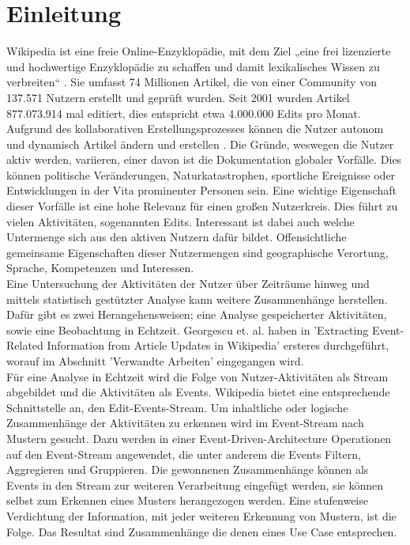 \section{Einleitung}\label{sec:Einleitung}
Wikipedia ist eine freie Online-Enzyklopädie, mit dem Ziel „eine frei lizenzierte und hochwertige Enzyklopädie zu schaffen und damit lexikalisches Wissen zu verbreiten“ \cite{wales.}. Sie umfasst 74 Millionen Artikel, die von einer Community von 137.571 Nutzern erstellt und geprüft wurden. Seit 2001 wurden Artikel 877.073.914 mal editiert, dies entspricht etwa 4.000.000 Edits pro Monat. \cite{wikistat}\\

Aufgrund des kollaborativen Erstellungsprozesses können die Nutzer autonom und dynamisch Artikel ändern und erstellen \cite{wikipedia.}.
Die Gründe, weswegen die Nutzer aktiv werden, variieren, einer davon ist die Dokumentation globaler Vorfälle. Dies können politische Veränderungen, Naturkatastrophen, sportliche Ereignisse oder Entwicklungen in der Vita prominenter Personen sein. Eine wichtige Eigenschaft dieser Vorfälle ist eine hohe Relevanz für einen großen Nutzerkreis. Dies führt zu vielen Aktivitäten, sogenannten Edits. Interessant ist dabei auch welche Untermenge sich aus den aktiven Nutzern dafür bildet. Offensichtliche gemeinsame Eigenschaften dieser Nutzermengen sind geographische Verortung, Sprache, Kompetenzen und Interessen. \cite{10.1007978-3-642-36973-5_22}\\

Eine Untersuchung der Aktivitäten der Nutzer über Zeiträume hinweg und mittels statistisch gestützter Analyse kann weitere Zusammenhänge herstellen. Dafür gibt es zwei Herangehensweisen; eine Analyse gespeicherter Aktivitäten, sowie eine Beobachtung in Echtzeit. Georgescu et. al. \cite{10.1007978-3-642-36973-5_22} haben in 'Extracting Event-Related Information from Article Updates in Wikipedia' ersteres durchgeführt, worauf im Abschnitt 'Verwandte Arbeiten' eingegangen wird. \\

Für eine Analyse in Echtzeit wird die Folge von Nutzer-Aktivitäten als Stream abgebildet und die Aktivitäten als Events. Wikipedia bietet eine entsprechende Schnittstelle an, den Edit-Events-Stream. Um inhaltliche oder logische Zusammenhänge der Aktivitäten zu erkennen wird im Event-Stream nach Mustern gesucht. Dazu werden in einer Event-Driven-Architecture Operationen auf den Event-Stream angewendet, die unter anderem die Events Filtern, Aggregieren und Gruppieren. Die gewonnenen Zusammenhänge können als Events in den Stream zur weiteren Verarbeitung eingefügt werden, sie können selbst zum Erkennen eines Musters herangezogen werden. Eine stufenweise Verdichtung der Information, mit jeder weiteren Erkennung von Mustern, ist die Folge. Das Resultat sind Zusammenhänge die denen eines Use Case entsprechen.

